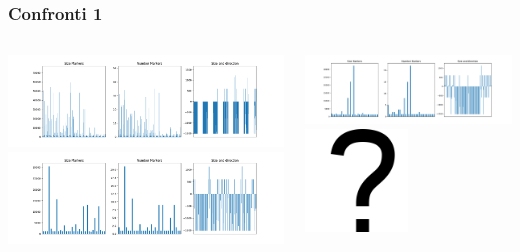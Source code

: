 \documentclass{beamer}[10pt]
\begin{document}
\begin{frame}
  \frametitle{Confronti 1}
  \begin{columns}[T]
    \begin{column}{0.33\textwidth}
      \begin{center}
        \includegraphics[width=\textwidth]{../img/ansa-figure.png}
        \includegraphics[width=\textwidth]{../img/archlinux-figure.png}
      \end{center}
    \end{column}
    \begin{column}{0.33\textwidth}
      \begin{center}
        \includegraphics[width=\textwidth]{../img/facebook-figure.png}
        \includegraphics[width=0.5\textwidth]{../img/questionMark.png}

\end{center}
\end{column}
\end{columns}
\end{frame}
\end{document}
